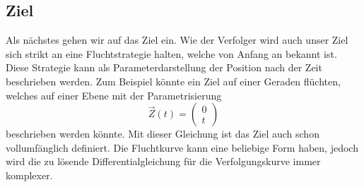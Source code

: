 \subsection{Ziel
\label{lambertw:subsection:Ziel}}
Als nächstes gehen wir auf das Ziel ein.
Wie der Verfolger wird auch unser Ziel sich strikt an eine Fluchtstrategie halten, welche von Anfang an bekannt ist.
Diese Strategie kann als Parameterdarstellung der Position nach der Zeit beschrieben werden.
Zum Beispiel könnte ein Ziel auf einer Geraden flüchten, welches auf einer Ebene mit der Parametrisierung
\begin{equation}
    \vec{Z}(t)
    =
    \left( \begin{array}{c} 0 \\  t \end{array} \right)
\end{equation}
beschrieben werden könnte.
Mit dieser Gleichung ist das Ziel auch schon vollumfänglich definiert.
Die Fluchtkurve kann eine beliebige Form haben, jedoch wird die zu lösende Differentialgleichung für die Verfolgungskurve immer komplexer.




